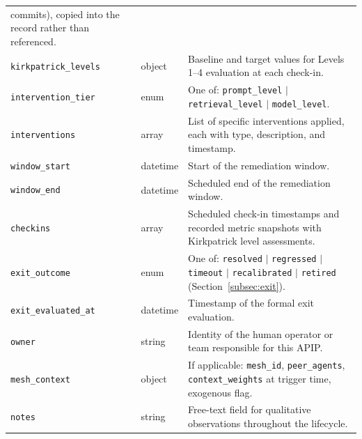 \documentclass[conference]{IEEEtran}
\begin{document}
\begin{table}[t]
\begin{tabular}{@{}L{4.2cm}L{1.8cm}L{10.4cm}@{}}
      commits), copied into the record rather than referenced. \\
    \texttt{kirkpatrick\_levels} & object &
      Baseline and target values for Levels 1--4 evaluation at each
      check-in. \\
    \texttt{intervention\_tier} & enum &
      One of: \texttt{prompt\_level} $|$ \texttt{retrieval\_level} $|$
      \texttt{model\_level}. \\
    \texttt{interventions} & array &
      List of specific interventions applied, each with type, description,
      and timestamp. \\
    \texttt{window\_start} & datetime &
      Start of the remediation window. \\
    \texttt{window\_end} & datetime &
      Scheduled end of the remediation window. \\
    \texttt{checkins} & array &
      Scheduled check-in timestamps and recorded metric snapshots with
      Kirkpatrick level assessments. \\
    \texttt{exit\_outcome} & enum &
      One of: \texttt{resolved} $|$ \texttt{regressed} $|$ \texttt{timeout}
      $|$ \texttt{recalibrated} $|$ \texttt{retired}
      (Section~\ref{subsec:exit}). \\
    \texttt{exit\_evaluated\_at} & datetime &
      Timestamp of the formal exit evaluation. \\
    \texttt{owner} & string &
      Identity of the human operator or team responsible for this APIP. \\
    \texttt{mesh\_context} & object &
      If applicable: \texttt{mesh\_id}, \texttt{peer\_agents},
      \texttt{context\_weights} at trigger time, exogenous flag. \\
    \texttt{notes} & string &
      Free-text field for qualitative observations throughout the
      lifecycle. \\
    \bottomrule
  \end{tabular}
\end{table}
\end{document}
